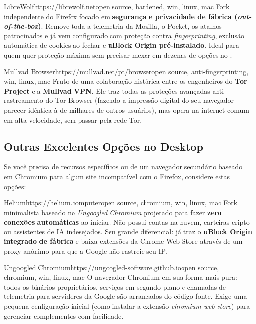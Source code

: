 \documentclass{pousadaguide}
\begin{document}
\begin{ferramenta}[goat,logo=librewolf]{LibreWolf}{https://librewolf.net}{open source, hardened, win, linux, mac}
Fork independente do Firefox focado em \textbf{segurança e privacidade de fábrica (\emph{out-of-the-box})}. Remove toda a telemetria da Mozilla, o Pocket, os atalhos patrocinados e já vem configurado com proteção contra \emph{fingerprinting}, exclusão automática de cookies ao fechar e \textbf{uBlock Origin pré-instalado}. Ideal para quem quer proteção máxima sem precisar mexer em dezenas de opções no . 
\end{ferramenta}

\begin{ferramenta}[goat,logo=mullvad]{Mullvad Browser}{https://mullvad.net/pt/browser}{open source, anti-fingerprinting, win, linux, mac}
Fruto de uma colaboração histórica entre os engenheiros do \textbf{Tor Project} e a \textbf{Mullvad VPN}. Ele traz todas as proteções avançadas anti-rastreamento do Tor Browser (fazendo a impressão digital do seu navegador parecer idêntica à de milhares de outros usuários), mas opera na internet comum em alta velocidade, sem passar pela rede Tor. 
\end{ferramenta}

\subsection{Outras Excelentes Opções no Desktop}

Se você precisa de recursos específicos ou de um navegador secundário baseado em Chromium para algum site incompatível com o Firefox, considere estas opções:

\begin{ferramenta}[recomendado,logo=helium]{Helium}{https://helium.computer}{open source, chromium, win, linux, mac}
Fork minimalista baseado no \emph{Ungoogled Chromium} projetado para fazer \textbf{zero conexões automáticas} ao iniciar. Não possui contas na nuvem, carteiras cripto ou assistentes de IA indesejados. Seu grande diferencial: já traz o \textbf{uBlock Origin integrado de fábrica} e baixa extensões da Chrome Web Store através de um proxy anônimo para que a Google não rastreie seu IP. 
\end{ferramenta}

\begin{ferramenta}[logo=ungoogled-chromium]{Ungoogled Chromium}{https://ungoogled-software.github.io}{open source, chromium, win, linux, mac}
O navegador Chromium em sua forma mais pura: todos os binários proprietários, serviços em segundo plano e chamadas de telemetria para servidores da Google são arrancados do código-fonte. Exige uma pequena configuração inicial (como instalar a extensão \emph{chromium-web-store}) para gerenciar complementos com facilidade. 
\end{ferramenta}
\end{document}
